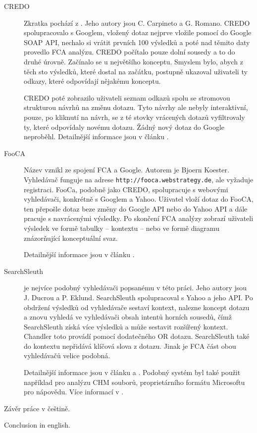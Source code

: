 \documentclass[12pt]{article}
\newcommand{\name}{Chandler}
\newcommand{\code}[1]{\texttt{#1}}
\begin{document}
\begin{description}
	\item[CREDO] Zkratka pochází z . Jeho autory jsou C. Carpineto a G. Romano. CREDO spolupracovalo s Googlem, vložený dotaz nejprve vložile pomocí do Google SOAP API, nechalo si vrátit prvních 100 výsledků a poté nad těmito daty provedlo FCA analýzu. CREDO počítalo pouze dolní sousedy a to do druhé úrovně. Začínalo se u největšího konceptu. Smyslem bylo, abych z těch sto výsledků, které dostal na začátku, postupně ukazoval uživateli ty odkazy, které odpovídají nějakému konceptu. 

	CREDO poté zobrazilo uživateli seznam odkazů spolu se stromovou strukturou návrhů na změnu dotazu. Tyto návrhy ale nebyly interaktivní, pouze, po kliknutí na návrh, se z té stovky vrácených dotazů vyfiltrovaly ty, které odpovídaly novému dotazu. Žádný nový dotaz do Google neproběhl. Detailnější informace jsou v článku \cite{credo}.

	\item[FooCA] Název vznikl ze spojení FCA a Google. Autorem je Bjoern Koester. Vyhledávač funguje na adrese \code{http://fooca.webstrategy.de}, ale vyžaduje registraci. FooCa, podobně jako CREDO, spolupracuje s webovými vyhledávači, konkrétně s Googlem a Yahoo. Uživatel vloží dotaz do FooCA, ten přepošle dotaz beze změny do Google API nebo do Yahoo API a dále pracuje s navrácenými výsledky. Po skončení FCA analýzy zobrazí uživateli výsledek ve formě tabulky -- kontextu -- nebo ve formě diagramu znázorňující konceptuální svaz. 

	Detailnější informace jsou v článku \cite{fooca}.
	\item[SearchSleuth] je nejvíce podobný vyhledávači popsanému v této práci. Jeho autory jsou J. Ducrou a P. Eklund. SearchSleuth  spolupracoval s Yahoo a jeho API. Po obdržení výsledků od vyhledávače sestaví kontext, nalezne koncept dotazu a znovu vyhledá ve vyhledávači obsah intentů horních sousedů, čímž SearchSleuth získá více výsledků a může sestavit rozšířený kontext. \name{} toto provádí pomocí dodatečného OR dotazu. SearchSleuth také do kontextu nepřidává klíčová slova z dotazu. Jinak je FCA část obou vyhledávačů velice podobná. 

	Detailnější informace jsou v článku \cite{searchsleuth} a \cite{fcasim}. Podobný systém byl také použit například pro analýzu CHM souborů, proprietárního formátu Microsoftu pro nápovědu. Více informací v \cite{helpsleuth}.
\end{description} 

\begin{conclusions-cz}
  Závěr práce v češtině.
\end{conclusions-cz}


\begin{conclusions-en}
  Conclusion in english.
\end{conclusions-en}

\newpage


\end{document}
